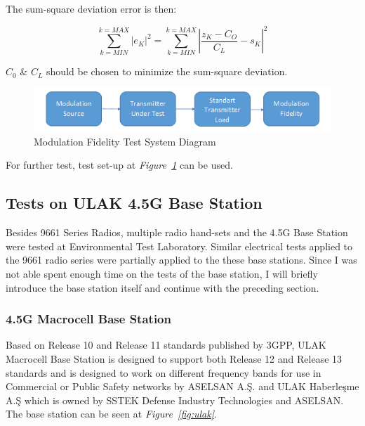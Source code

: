 	The sum-square deviation error is then:
	
$$	\sum_{k=MIN}^{k=MAX} {|e_K|}^2 = \sum_{k=MIN}^{k=MAX} {|\frac{z_K - C_O}{C_L}-s_K|}^2	$$
	
	$C_0$ \& $C_L$ should be chosen to minimize the sum-square deviation.
	
	
\begin{figure}[H]
	\center
	\setlength{\unitlength}{\textwidth} 
	\includegraphics[width=1.0\unitlength]{modfide}
	\caption{\label{fig:modfide}Modulation Fidelity Test System Diagram }
\end{figure}


	For further test, test set-up at \textit{Figure~\ref{fig:modfide}} can be used. 





\subsection{Tests on ULAK 4.5G Base Station  }
\- \indent
	Besides 9661 Series Radios, multiple radio hand-sets and the 4.5G Base Station were tested at Environmental Test Laboratory. Similar electrical tests applied to the 9661 radio series were partially applied to the these base stations. Since I was not able spent enough time on the tests of the base station, I will briefly introduce the base station itself and continue with the preceding section. 

\subsubsection{4.5G Macrocell Base Station}
\- \indent
	Based on Release 10 and Release 11 standards published by 3GPP, ULAK Macrocell Base Station is designed to support both Release 12 and Release 13 standards and is designed to work on different frequency bands for use in Commercial or Public Safety networks\cite{ulak} by ASELSAN A.Ş. and ULAK Haberleşme A.Ş which is owned by SSTEK Defense Industry Technologies and ASELSAN.  The base station can be seen at \textit{Figure~\ref{fig:ulak}}.

